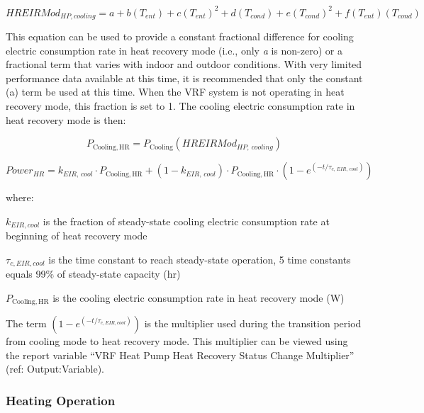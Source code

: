 \begin{equation}
  HREIRMod_{HP,cooling} = a + b \left( T_{ent} \right) + c \left( T_{ent} \right)^2 + d \left( T_{cond} \right) + e \left( T_{cond} \right)^2 + f \left( T_{ent} \right) \left( T_{cond} \right)
\end{equation}

This equation can be used to provide a constant fractional difference for cooling electric consumption rate in heat recovery mode (i.e., only \emph{a} is non-zero) or a fractional term that varies with indoor and outdoor conditions. With very limited performance data available at this time, it is recommended that only the constant (a) term be used at this time. When the VRF system is not operating in heat recovery mode, this fraction is set to 1. The cooling electric consumption rate in heat recovery mode is then:

\begin{equation}
  P_{\mathrm{Cooling, HR}} = P_{\mathrm{Cooling}} \left( HREIRMod_{HP,\,cooling} \right)
\end{equation}

\begin{equation}
  Power_{HR} = k_{EIR,\,cool} \cdot P_{\mathrm{Cooling, HR}} + \left( 1 - k_{EIR,\,cool} \right) \cdot P_{\mathrm{Cooling, HR}} \cdot \left( 1 - e^{\left( -t / \tau_{c,\,EIR,\,cool} \right)} \right)
\end{equation}

where:

\(k_{EIR,cool}\) is the fraction of steady-state cooling electric consumption rate at beginning of heat recovery mode

\(\tau_{c,EIR,cool}\) is the time constant to reach steady-state operation, 5 time constants equals 99\% of steady-state capacity (hr)

$P_{\mathrm{Cooling, HR}}$ is the cooling electric consumption rate in heat recovery mode (W)

The term \(\left( 1 - e^{\left( -t / \tau_{c,EIR,cool} \right)} \right)\) is the multiplier used during the transition period from cooling mode to heat recovery mode. This multiplier can be viewed using the report variable ``VRF Heat Pump Heat Recovery Status Change Multiplier'' (ref: Output:Variable).

\subsubsection{Heating Operation}\label{heating-operation-201605050924}

